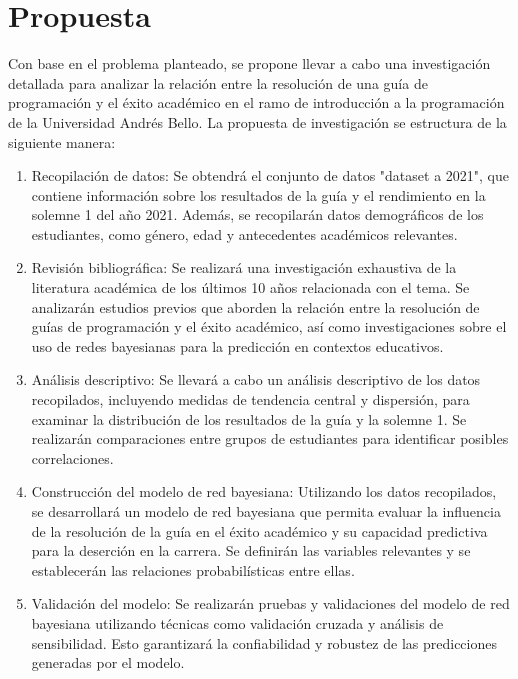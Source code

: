 \hypertarget{propuesta}{%
    \section{Propuesta}\label{propuesta}}


Con base en el problema planteado, se propone llevar a cabo una investigación detallada para analizar la relación entre la resolución de una guía de programación y el éxito académico en el ramo de introducción a la programación de la Universidad Andrés Bello. La propuesta de investigación se estructura de la siguiente manera:

\begin{enumerate}
    \item Recopilación de datos: Se obtendrá el conjunto de datos "dataset a 2021", que contiene información sobre los resultados de la guía y el rendimiento en la solemne 1 del año 2021. Además, se recopilarán datos demográficos de los estudiantes, como género, edad y antecedentes académicos relevantes.

    \item Revisión bibliográfica: Se realizará una investigación exhaustiva de la literatura académica de los últimos 10 años relacionada con el tema. Se analizarán estudios previos que aborden la relación entre la resolución de guías de programación y el éxito académico, así como investigaciones sobre el uso de redes bayesianas para la predicción en contextos educativos.

    \item Análisis descriptivo: Se llevará a cabo un análisis descriptivo de los datos recopilados, incluyendo medidas de tendencia central y dispersión, para examinar la distribución de los resultados de la guía y la solemne 1. Se realizarán comparaciones entre grupos de estudiantes para identificar posibles correlaciones.

    \item Construcción del modelo de red bayesiana: Utilizando los datos recopilados, se desarrollará un modelo de red bayesiana que permita evaluar la influencia de la resolución de la guía en el éxito académico y su capacidad predictiva para la deserción en la carrera. Se definirán las variables relevantes y se establecerán las relaciones probabilísticas entre ellas.

    \item Validación del modelo: Se realizarán pruebas y validaciones del modelo de red bayesiana utilizando técnicas como validación cruzada y análisis de sensibilidad. Esto garantizará la confiabilidad y robustez de las predicciones generadas por el modelo.


\end{enumerate}
